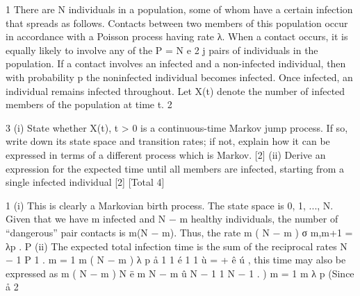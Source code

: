 \documentclass[a4paper,12pt]{article}
\begin{document}
1
There are N individuals in a population, some of whom have a certain infection
that spreads as follows. Contacts between two members of this population occur
in accordance with a Poisson process having rate λ. When a contact occurs, it is
equally likely to involve any of the P =
N
e 2 j
pairs of individuals in the population.
If a contact involves an infected and a non-infected individual, then with
probability p the noninfected individual becomes infected. Once infected, an
individual remains infected throughout. Let X(t) denote the number of infected
members of the population at time t.
2

3
(i) State whether X(t), t > 0 is a continuous-time Markov jump process. If so,
write down its state space and transition rates; if not, explain how it can
be expressed in terms of a different process which is Markov.
[2]
(ii) Derive an expression for the expected time until all members are infected,
starting from a single infected individual
[2]
[Total 4]

1
(i)
This is clearly a Markovian birth process. The state space is {0, 1, ..., N}.
Given that we have m infected and N − m healthy individuals, the
number of “dangerous” pair contacts is m(N − m). Thus, the rate
m ( N − m )
σ m,m+1 = λp
.
P
(ii)
The expected total infection time is the sum of the reciprocal rates
N − 1
P
1
.
m
=
1
m ( N − m )
λ p
å
1
1 é 1
1 ù
=
+
ê
ú , this time may also be expressed as
m ( N − m )
N ë m N − m û
N − 1 1
N − 1
. )
m
= 1 m
λ p
(Since
å
2
\end{document}
